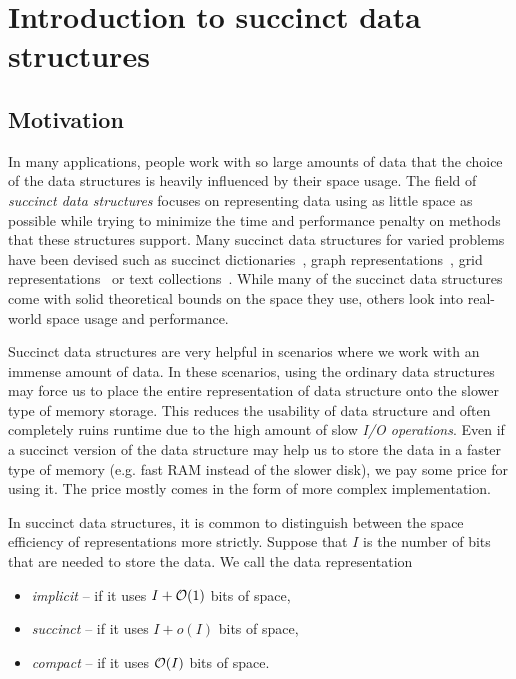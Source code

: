 \chapter{Introduction to succinct data structures}
\label{kap:kap1}


\section{Motivation}

In many applications, people work with so large amounts of data that the choice of
the data structures is heavily influenced by their space usage. The field
of \textit{succinct data structures} focuses on representing data using as little
space as possible while trying to minimize the time and performance penalty on methods
that these structures support. Many succinct data structures for varied problems
have been devised such as succinct dictionaries~\citep{raman2007succinct},
graph representations~\citep{farzan2013succinct}, grid representations~\citep{chazelle1988functional}
or text collections~\citep{ferragina2000opportunistic}. While many of the succinct
data structures come with solid theoretical bounds on the space they use, others look
into real-world space usage and performance.

Succinct data structures are very helpful in scenarios where we work with an immense amount
of data. In these scenarios, using the ordinary data structures may force us to place
the entire representation of data structure onto the slower type of memory storage. This
reduces the usability of data structure and often completely ruins runtime due to the
high amount of slow \textit{I/O operations}. Even if a succinct version of the data structure
may help us to store the data in a faster type of memory (e.g. fast RAM instead of the slower disk),
we pay some price for using it. The price mostly comes in the form of more complex implementation.

In succinct data structures, it is common to distinguish between the space efficiency of
representations more strictly. Suppose that $I$ is the number of bits that are needed to
store the data. We call the data representation
\begin{itemize}
	\item \textit{implicit} -- if it uses $I + \mathcal{O}(1)$ bits of space,
	\item \textit{succinct} -- if it uses $I + o(I)$ bits of space,
	\item \textit{compact} -- if it uses $\mathcal{O}(I)$ bits of space.
\end{itemize}

